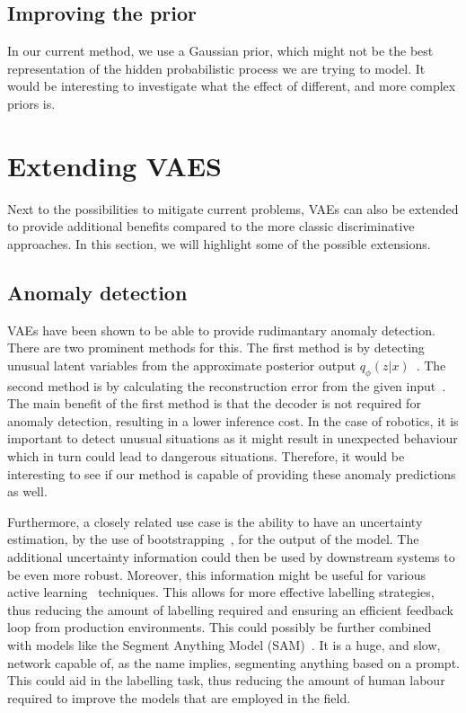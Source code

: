 \subsection{Improving the prior}
In our current method, we use a Gaussian prior, which might not be the best representation of the hidden probabilistic process we are trying to model. It would be interesting to investigate what the effect of different, and more complex priors is.

\section{Extending VAES}
Next to the possibilities to mitigate current problems, VAEs can also be extended to provide additional benefits compared to the more classic discriminative approaches. In this section, we will highlight some of the possible extensions.

\subsection{Anomaly detection}
VAEs have been shown to be able to provide rudimantary anomaly detection. There are two prominent methods for this. The first method is by detecting unusual latent variables from the approximate posterior output $q_{\phi}(z|x)$~\cite{marimont2020anomalydetectionlatentspace,angiulli2020improving,angiulli2023latent}. The second method is by calculating the reconstruction error from the given input~\cite{an2015variational, zhou2020unsupervisedanomalylocalizationusing, gouda2022unsupervised}. The main benefit of the first method is that the decoder is not required for anomaly detection, resulting in a lower inference cost. In the case of robotics, it is important to detect unusual situations as it might result in unexpected behaviour which in turn could lead to dangerous situations. Therefore, it would be interesting to see if our method is capable of providing these anomaly predictions as well.

Furthermore, a closely related use case is the ability to have an uncertainty estimation, by the use of bootstrapping~\cite{chen2018use,kohl2018probabilistic}, for the output of the model. The additional uncertainty information could then be used by downstream systems to be even more robust. Moreover, this information might be useful for various active learning~\cite{hino2020active} techniques. This allows for more effective labelling strategies, thus reducing the amount of labelling required and ensuring an efficient feedback loop from production environments. This could possibly be further combined with models like the Segment Anything Model (SAM)~\cite{kirillov2023segment}. It is a huge, and slow, network capable of, as the name implies, segmenting anything based on a prompt. This could aid in the labelling task, thus reducing the amount of human labour required to improve the models that are employed in the field.


